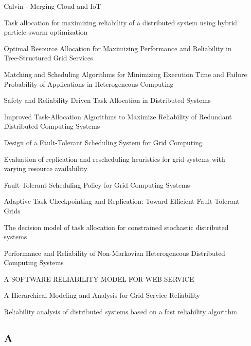 \documentclass{cslthse-msc}
\begin{document}
\begin{thebibliography}{50}
Calvin - Merging Cloud and IoT

Task allocation for maximizing reliability of a distributed system using hybrid particle swarm optimization

Optimal Resource Allocation for Maximizing Performance and Reliability in Tree-Structured Grid Services 

Matching and Scheduling Algorithms for Minimizing Execution Time and Failure Probability of Applications in Heterogeneous Computing

Safety and Reliability Driven Task Allocation in Distributed Systems

Improved Task-Allocation Algorithms to Maximize Reliability of Redundant Distributed Computing Systems 

Design of a Fault-Tolerant Scheduling System for Grid Computing

Evaluation of replication and rescheduling heuristics for grid systems with varying resource availability

Fault-Tolerant Scheduling Policy for Grid Computing Systems

Adaptive Task Checkpointing and Replication: Toward Efficient Fault-Tolerant Grids

The decision model of task allocation for constrained stochastic distributed systems

Performance and Reliability of Non-Markovian Heterogeneous Distributed Computing Systems

A SOFTWARE RELIABILITY MODEL FOR WEB SERVICE

A Hierarchical Modeling and Analysis for Grid Service Reliability

Reliability analysis of distributed systems based on a fast reliability algorithm

\end{thebibliography}

\begin{appendices}
\chapter{A}

\end{appendices}
\end{document}
